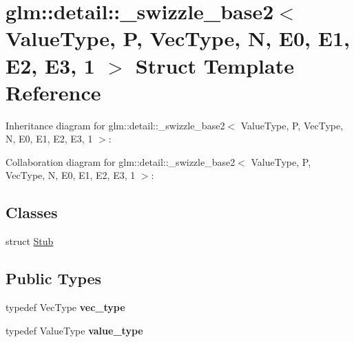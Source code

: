 \hypertarget{structglm_1_1detail_1_1__swizzle__base2_3_01_value_type_00_01_p_00_01_vec_type_00_01_n_00_01_e0_fc19218d69dc8988a4a57fbe7f79725c}{\section{glm\-:\-:detail\-:\-:\-\_\-swizzle\-\_\-base2$<$ Value\-Type, P, Vec\-Type, N, E0, E1, E2, E3, 1 $>$ Struct Template Reference}
\label{structglm_1_1detail_1_1__swizzle__base2_3_01_value_type_00_01_p_00_01_vec_type_00_01_n_00_01_e0_fc19218d69dc8988a4a57fbe7f79725c}
}


Inheritance diagram for glm\-:\-:detail\-:\-:\-\_\-swizzle\-\_\-base2$<$ Value\-Type, P, Vec\-Type, N, E0, E1, E2, E3, 1 $>$\-:


Collaboration diagram for glm\-:\-:detail\-:\-:\-\_\-swizzle\-\_\-base2$<$ Value\-Type, P, Vec\-Type, N, E0, E1, E2, E3, 1 $>$\-:
\subsection*{Classes}
\begin{DoxyCompactItemize}
\item 
struct \hyperlink{structglm_1_1detail_1_1__swizzle__base2_3_01_value_type_00_01_p_00_01_vec_type_00_01_n_00_01_e0_17279995be88bc842083eed40758473c}{Stub}
\end{DoxyCompactItemize}
\subsection*{Public Types}
\begin{DoxyCompactItemize}
\item 
\hypertarget{structglm_1_1detail_1_1__swizzle__base2_3_01_value_type_00_01_p_00_01_vec_type_00_01_n_00_01_e0_fc19218d69dc8988a4a57fbe7f79725c_aa478e9f198b8832d76245adde9c627ec}{typedef Vec\-Type {\bfseries vec\-\_\-type}}\label{structglm_1_1detail_1_1__swizzle__base2_3_01_value_type_00_01_p_00_01_vec_type_00_01_n_00_01_e0_fc19218d69dc8988a4a57fbe7f79725c_aa478e9f198b8832d76245adde9c627ec}

\item 
\hypertarget{structglm_1_1detail_1_1__swizzle__base2_3_01_value_type_00_01_p_00_01_vec_type_00_01_n_00_01_e0_fc19218d69dc8988a4a57fbe7f79725c_aea7ec681454787ad7a322c06aec98757}{typedef Value\-Type {\bfseries value\-\_\-type}}\label{structglm_1_1detail_1_1__swizzle__base2_3_01_value_type_00_01_p_00_01_vec_type_00_01_n_00_01_e0_fc19218d69dc8988a4a57fbe7f79725c_aea7ec681454787ad7a322c06aec98757}

\end{DoxyCompactItemize}
